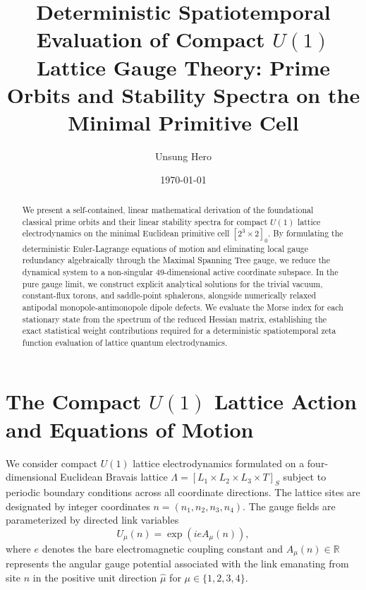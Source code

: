\documentclass[11pt,a4paper]{article}
\title{Deterministic Spatiotemporal Evaluation of Compact $U(1)$ Lattice Gauge Theory: Prime Orbits and Stability Spectra on the Minimal Primitive Cell}
\author{Unsung Hero}
\date{\today}
\begin{document}
\maketitle

\begin{abstract}
We present a self-contained, linear mathematical derivation of the foundational classical prime orbits and their linear stability spectra for compact $U(1)$ lattice electrodynamics on the minimal Euclidean primitive cell $[2^3 \times 2]_0$. By formulating the deterministic Euler-Lagrange equations of motion and eliminating local gauge redundancy algebraically through the Maximal Spanning Tree gauge, we reduce the dynamical system to a non-singular 49-dimensional active coordinate subspace. In the pure gauge limit, we construct explicit analytical solutions for the trivial vacuum, constant-flux torons, and saddle-point sphalerons, alongside numerically relaxed antipodal monopole-antimonopole dipole defects. We evaluate the Morse index for each stationary state from the spectrum of the reduced Hessian matrix, establishing the exact statistical weight contributions required for a deterministic spatiotemporal zeta function evaluation of lattice quantum electrodynamics.
\end{abstract}

\section{The Compact $U(1)$ Lattice Action and Equations of Motion}

We consider compact $U(1)$ lattice electrodynamics formulated on a four-dimensional Euclidean Bravais lattice $\Lambda = [L_1 \times L_2 \times L_3 \times T]_S$ subject to periodic boundary conditions across all coordinate directions. The lattice sites are designated by integer coordinates $n = (n_1, n_2, n_3, n_4)$. The gauge fields are parameterized by directed link variables
\begin{equation}
U_\mu(n) = \exp\left(i e A_\mu(n)\right),
\end{equation}
where $e$ denotes the bare electromagnetic coupling constant and $A_\mu(n) \in \mathbb{R}$ represents the angular gauge potential associated with the link emanating from site $n$ in the positive unit direction $\hat{\mu}$ for $\mu \in \{1,2,3,4\}$.
\end{document}
